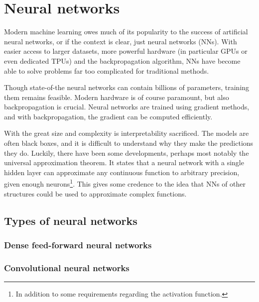 \section{Neural networks}
Modern machine learning owes much of its popularity to the success of artificial neural networks, or if the context is clear, just neural networks (NNs).
With easier access to larger datasets, more powerful hardware (in particular GPUs or even dedicated TPUs) and the backpropagation algorithm, NNs have become able to solve problems far too complicated for traditional methods.

Though state-of-the neural networks can contain billions of parameters, training them remains feasible.
Modern hardware is of course paramount, but also backpropagation is crucial.
Neural networks are trained using gradient methods, and with backpropagation, the gradient can be computed efficiently.

With the great size and complexity is interpretability sacrificed.
The models are often black boxes, and it is difficult to understand why they make the predictions they do.
Luckily, there have been some developments, perhaps most notably the universal approximation theorem.
It states that a neural network with a single hidden layer can approximate any continuous function to arbitrary precision, given enough neurons\footnote{In addition to some requirements regarding the activation function.}.
This gives some credence to the idea that NNs of other structures could be used to approximate complex functions.


\subsection{Types of neural networks}
\subsubsection{Dense feed-forward neural networks}
\subsubsection{Convolutional neural networks}
